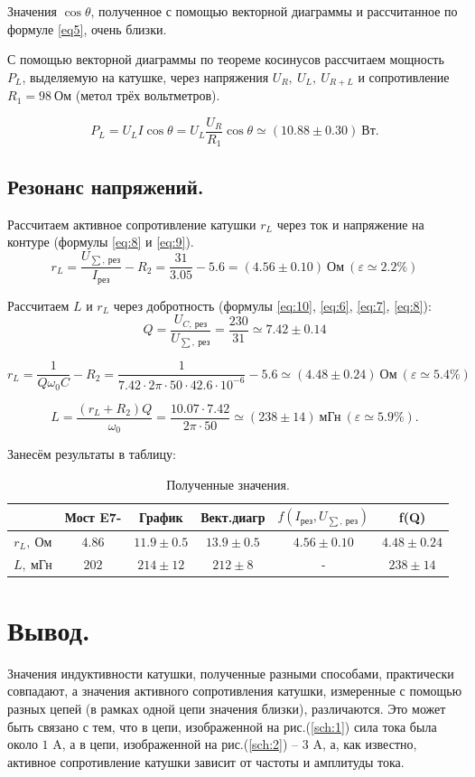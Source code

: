 \documentclass[a4paper, 12pt, twoside]{article}
\begin{document}
Значения $\cos \theta$, полученное с помощью векторной диаграммы и рассчитанное по формуле \eqref{eq5}, очень близки.

С помощью векторной диаграммы по теореме косинусов рассчитаем мощность $P_L$, выделяемую на катушке, через напряжения $U_R,~U_L,~U_{R+L}$ и сопротивление $R_1 = 98~\text{Ом}$ (метол трёх вольтметров).

$$P_L = U_L I \cos\theta = U_L \dfrac{U_R}{R_1}\cos\theta \simeq (10.88 \pm 0.30)~\text{Вт}.$$

\subsection{Резонанс напряжений.}

Рассчитаем активное сопротивление катушки $r_L$ через ток и напряжение на контуре (формулы \eqref{eq:8} и \eqref{eq:9}).
$$ r_L = \dfrac{U_{\sum,~ \text{рез}}}{I_{\text{рез}}} - R_2 = \dfrac{31}{3.05} - 5.6 = (4.56 \pm 0.10)~ \text{Ом}~(\varepsilon \simeq 2.2\%) $$

Рассчитаем $L$ и $r_L$ через добротность (формулы \eqref{eq:10}, \eqref{eq:6}, \eqref{eq:7}, \eqref{eq:8}):
$$Q = \dfrac{U_{C,~\text{рез}}}{U_{\sum,~\text{рез}}} = \dfrac{230}{31} \simeq 7.42 \pm 0.14$$

$$r_L = \dfrac{1}{Q\omega_0 C} - R_2 = \dfrac{1}{7.42 \cdot 2\pi \cdot 50\cdot 42.6\cdot 10^{-6}} - 5.6 \simeq (4.48 \pm 0.24)~\text{Ом}~(\varepsilon \simeq 5.4\%)$$

$$L = \dfrac{(r_L+R_2)Q}{\omega_0} = \dfrac{10.07\cdot 7.42}{2\pi \cdot 50} \simeq (238 \pm 14)~\text{мГн}~(\varepsilon \simeq 5.9\%).$$

Занесём результаты в таблицу:

\begin{table}[H]
	\centering
	\caption{Полученные значения.}
	\begin{tabular}{c|c|c|c|c|c} \toprule
		& Мост E7- & График & Вект.диагр & $f(I_{\text{рез}},U_{\sum,~\text{рез}})$ & f(Q) \\ \midrule
		$r_L,~\text{Ом}$ & $4.86$         & $11.9\pm 0.5$       & $13.9 \pm 0.5$           &$4.56 \pm 0.10$                                    &$4.48 \pm 0.24$      \\
		$L,~\text{мГн}$  & $202$         &  $214 \pm 12$      &   $212 \pm 8$         &     -                                     &$238 \pm 14$  \\ \bottomrule   
	\end{tabular}
\end{table}

\section{Вывод.}

Значения индуктивности катушки, полученные разными способами, практически совпадают, а значения активного сопротивления катушки, измеренные с помощью разных цепей (в рамках одной цепи значения близки), различаются. Это может быть связано с тем, что в цепи, изображенной на рис.(\ref{sch:1}) сила тока была около $1$ A, а в цепи, изображенной на рис.(\ref{sch:2}) -- $3$ A, а, как известно, активное сопротивление катушки зависит от частоты и амплитуды тока.
\end{document}
